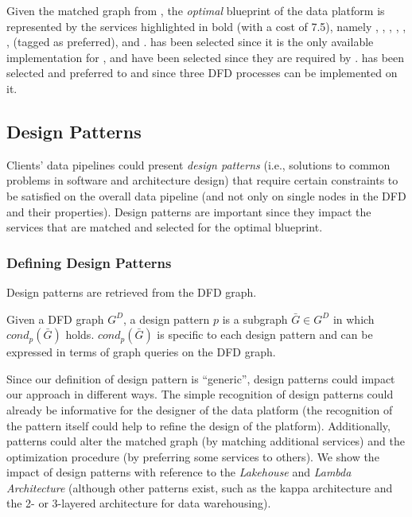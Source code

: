 \begin{example}[Optimization]
\label{ex:pdd-optimization}
Given the matched graph from , the \textit{optimal} blueprint of the data platform is represented by the services highlighted in bold (with a cost of 7.5), namely , , , , , ,  (tagged as preferred), and .  has been selected since it is the only available implementation for ,  and  have been selected since they are required by .  has been selected and preferred to  and  since three DFD processes can be implemented on it.
\end{example}

\subsection{Design Patterns}
\label{sec:pdd-patterns}

Clients' data pipelines could present \textit{design patterns} (i.e., solutions to common problems in software and architecture design) that require certain constraints to be satisfied on the overall data pipeline (and not only on single nodes in the DFD and their properties). Design patterns are important since they impact the services that are matched and selected for the optimal blueprint.

\subsubsection{Defining Design Patterns}

Design patterns are retrieved from the DFD graph.
\begin{definition}
Given a DFD graph $G^D$, a design pattern $p$ is a subgraph $\bar{G} \in G^D$ in which $cond_p(\bar{G})$ holds. $cond_p(\bar{G})$ is specific to each design pattern and can be expressed in terms of graph queries on the DFD graph.
\end{definition}

Since our definition of design pattern is ``generic'', design patterns could impact our approach in different ways. The simple recognition of design patterns could already be informative for the designer of the data platform (the recognition of the pattern itself could help to refine the design of the platform). Additionally, patterns could alter the matched graph (by matching additional services) and the optimization procedure (by preferring some services to others). We show the impact of design patterns with reference to the \textit{Lakehouse} and \textit{Lambda Architecture} (although other patterns exist, such as the kappa architecture and the 2- or 3-layered architecture for data warehousing).

